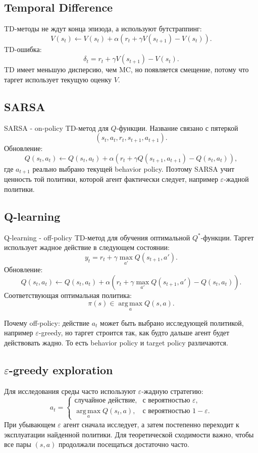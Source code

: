 \documentclass[11pt,a4paper]{article}
\newcommand{\argmax}{\operatorname*{arg\,max}}
\newcommand{\1}{\mathbf{1}}
\begin{document}
\subsection*{Temporal Difference}
TD-методы не ждут конца эпизода, а используют бутстраппинг:
\[
    V(s_t)\leftarrow V(s_t)+\alpha\left(r_t+\gamma V(s_{t+1})-V(s_t)\right).
\]
TD-ошибка:
\[
    \delta_t=r_t+\gamma V(s_{t+1})-V(s_t).
\]
TD имеет меньшую дисперсию, чем MC, но появляется смещение, потому что таргет использует текущую оценку $V$.

\subsection*{SARSA}
SARSA - on-policy TD-метод для $Q$-функции. Название связано с пятеркой
\[
    (s_t,a_t,r_t,s_{t+1},a_{t+1}).
\]
Обновление:
\[
    Q(s_t,a_t)\leftarrow Q(s_t,a_t)+\alpha\left(r_t+\gamma Q(s_{t+1},a_{t+1})-Q(s_t,a_t)\right),
\]
где $a_{t+1}$ реально выбрано текущей behavior policy. Поэтому SARSA учит ценность той политики, которой агент фактически следует, например $\varepsilon$-жадной политики.

\subsection*{Q-learning}
Q-learning - off-policy TD-метод для обучения оптимальной $Q^*$-функции. Таргет использует жадное действие в следующем состоянии:
\[
    y_t=r_t+\gamma\max_{a'}Q(s_{t+1},a').
\]
Обновление:
\[
    Q(s_t,a_t)\leftarrow Q(s_t,a_t)+\alpha\left(r_t+\gamma\max_{a'}Q(s_{t+1},a')-Q(s_t,a_t)\right).
\]
Соответствующая оптимальная политика:
\[
    \pi(s)\in\argmax_a Q(s,a).
\]

Почему off-policy: действие $a_t$ может быть выбрано исследующей политикой, например $\varepsilon$-greedy, но таргет строится так, как будто дальше агент будет действовать жадно. То есть behavior policy и target policy различаются.

\subsection*{$\varepsilon$-greedy exploration}
Для исследования среды часто используют $\varepsilon$-жадную стратегию:
\[
    a_t=\begin{cases}
    \text{случайное действие}, & \text{с вероятностью }\varepsilon,\\
    \argmax_a Q(s_t,a), & \text{с вероятностью }1-\varepsilon.
    \end{cases}
\]
При убывающем $\varepsilon$ агент сначала исследует, а затем постепенно переходит к эксплуатации найденной политики. Для теоретической сходимости важно, чтобы все пары $(s,a)$ продолжали посещаться достаточно часто.
\end{document}
